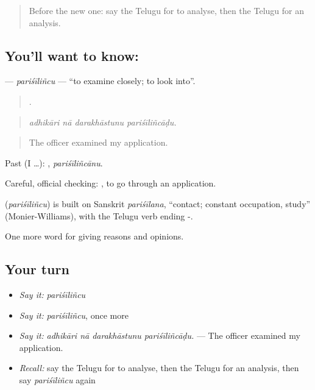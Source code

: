 \label{lesson:TE-C389-parisilincu}



\begin{quote}
Before the new one: say the Telugu for to analyse, then the Telugu for an analysis.
\end{quote}

\subsection*{You'll want to know: }
\textbf{} — \emph{pariśīliñcu} — \textquotedblleft{}to examine closely; to look into\textquotedblright{}.

\begin{quote}
   .
\end{quote}

\begin{quote}
\emph{adhikāri nā darakhāstunu pariśīliñcāḍu.}
\end{quote}

\begin{quote}
The officer examined my application.
\end{quote}

Past (I …): , \emph{pariśīliñcānu}.

Careful, official checking:  , to go through an application.

\begin{cousinweb}
\textbf{} (\emph{pariśīliñcu}) is built on Sanskrit \emph{pariśīlana}, \textquotedblleft{}contact; constant occupation, study\textquotedblright{} (Monier-Williams), with the Telugu verb ending -.
\end{cousinweb}

\begin{grammarlens}[title={What you've built}]
One more word for giving reasons and opinions.
\end{grammarlens}

\subsection*{Your turn}
\begin{itemize}
\raggedright
  \item \emph{Say it:} \emph{pariśīliñcu}
  \item \emph{Say it:} \emph{pariśīliñcu}, once more
  \item \emph{Say it:} \emph{adhikāri nā darakhāstunu pariśīliñcāḍu.} — The officer examined my application.
  \item \emph{Recall:} say the Telugu for to analyse, then the Telugu for an analysis, then say \emph{pariśīliñcu} again
\end{itemize}

